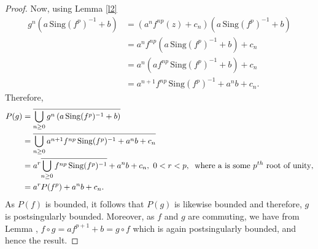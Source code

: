 \documentclass[a4paper,12pt]{amsart}
\numberwithin{equation}{section}
\newtheorem{remark}[theorem]{Remark}
\begin{document}
\begin{proof}
		Now, using Lemma \ref{l2}
		\begin{align*}
			g^n \left( a \, \mathrm{Sing}(f^p)^{-1} + b \right)
			&= (a^nf^{np}(z)+ c_n)\left( a \, \mathrm{Sing}(f^p)^{-1} + b \right) \\
			&=a^nf^{np}\left( a \, \mathrm{Sing}(f^p)^{-1} + b \right)+ c_n \\
			&= a^n\left( a f^{np} \, \mathrm{Sing}(f^p)^{-1} + b \right)+ c_n \\
			&=a^{n+1} f^{np} \, \mathrm{Sing}(f^p)^{-1} + a^nb+ c_n.
		\end{align*}
		Therefore,
		\begin{align*}
			P(g)
			&= \overline {\bigcup_{n \geq 0} g^n \left( a \, \mathrm{Sing}(f^p)^{-1} + b \right)}\\
			&= \overline {\bigcup_{n \geq 0} a^{n+1} f^{np} \, \mathrm{Sing}(f^p)^{-1} + a^nb+ c_n} \\
			&= a^{r} \overline {\bigcup_{n \geq 0} f^{np} \, \mathrm{Sing}(f^p)^{-1}} + a^nb+ c_n ,  \,  \, 0<r< p,\hspace{.2cm} \text {where a is some $p^{th}$ root of unity},\\
			&= a^{r} P(f^p) + a^nb +c_n.
		\end{align*}
		As $P(f)$ is bounded, it follows that $P(g)$ is likewise bounded and therefore, $g$ is postsingularly bounded. 
		Moreover, as $f$ and $g$ are commuting, we have from Lemma , $f\circ g = a f^{p+1} +b =g\circ f$ 
		which is again postsingularly bounded, and hence the result.
	\end{proof}
\end{document}
